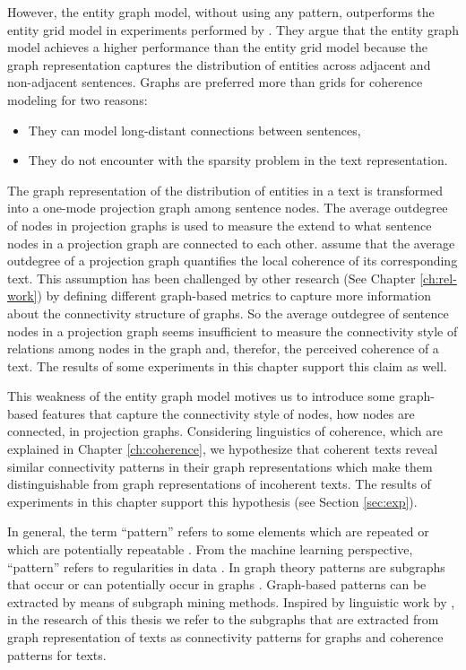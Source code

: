 However, the entity graph model, without using any pattern, outperforms the entity grid model in experiments performed by . 
They argue that the entity graph model achieves a higher performance than the entity grid model because the graph representation captures the distribution of entities across adjacent and non-adjacent sentences. 
Graphs are preferred more than grids for coherence modeling for two reasons:

\begin{itemize}

	\item They can model long-distant connections between sentences,

	\item They do not encounter with the sparsity problem in the text representation. 

\end{itemize}

The graph representation of the distribution of entities in a text is transformed into a one-mode projection graph among sentence nodes. 
The average outdegree of nodes in projection graphs is used to measure the extend to what sentence nodes in a projection graph are connected to each other. 
 assume that the average outdegree of a projection graph quantifies the local coherence of its corresponding text. 
This assumption has been challenged by other research (See Chapter \ref{ch:rel-work}) by defining different graph-based metrics to capture more information about the connectivity structure of graphs. 
So the average outdegree of sentence nodes in a projection graph seems insufficient to measure the connectivity style of relations among nodes in the graph and, therefor, the perceived coherence of a text. 
The results of some experiments in this chapter support this claim as well. 

This weakness of the entity graph model motives us to introduce some graph-based features that capture the connectivity style of nodes, how nodes are connected, in projection graphs. 
Considering linguistics of coherence, which are explained in Chapter \ref{ch:coherence}, we hypothesize that  coherent texts reveal similar connectivity patterns in their graph representations which make them distinguishable from graph representations of incoherent texts. 
The results of experiments in this chapter support this hypothesis (see Section \ref{sec:exp}). 

In general, the term ``pattern'' refers to some elements which are repeated or which are potentially repeatable \cite{}. 
From the machine learning perspective, ``pattern'' refers to regularities in data \cite{bishop06}.     
In graph theory patterns are subgraphs that occur or can potentially occur in graphs \cite{newmanmark10}. 
Graph-based patterns can be extracted by means of subgraph mining methods. 
Inspired by linguistic work by , in the research of this thesis we refer to the  subgraphs that are extracted from graph representation of texts as connectivity patterns for graphs and coherence patterns for texts.  


